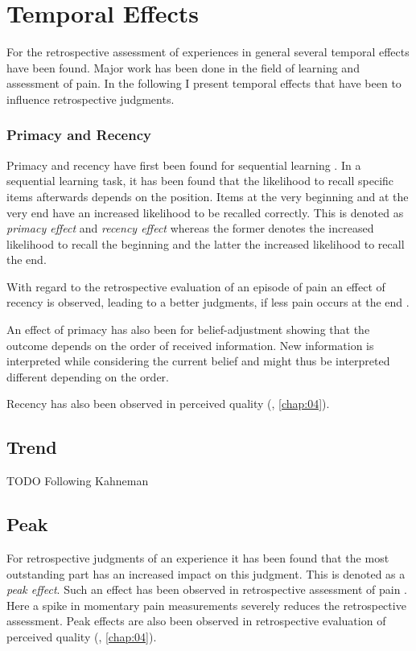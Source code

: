 
\section{Temporal Effects}

For the retrospective assessment of experiences in general several temporal effects have been found.
Major work has been done in the field of learning and assessment of pain.
In the following I present temporal effects that have been to influence retrospective judgments.

\subsubsection*{Primacy and Recency}
Primacy and recency have first been found for sequential learning \citep[cf.,][]{murdock_jr._serial_1962}.
In a sequential learning task, it has been found that the likelihood to recall specific items afterwards depends on the position.
Items at the very beginning and at the very end have an increased likelihood to be recalled correctly.
This is denoted as \emph{primacy effect} and \emph{recency effect} whereas the former denotes the increased likelihood to recall the beginning and the latter the increased likelihood to recall the end.

With regard to the retrospective evaluation of an episode of pain an effect of recency is observed, leading to a better judgments, if less pain occurs at the end \citep[\cf,][]{kahneman_when_1993, redelmeier_patients_1996}.

An effect of primacy has also been for belief-adjustment showing that the outcome depends on the order of received information.
New information is interpreted while considering the current belief and might thus be interpreted different depending on the order.

Recency has also been observed in perceived quality (\cf, \autoref{chap:04}).

\subsection*{Trend}

TODO Following Kahneman

\subsection*{Peak}
For retrospective judgments of an experience it has been found that the most outstanding part has an increased impact on this judgment.
This is denoted as a \emph{peak effect}.
Such an effect has been observed in retrospective assessment of pain \citep[\cf,][]{kahneman_when_1993, redelmeier_patients_1996}.
Here a spike in momentary pain measurements severely reduces the retrospective assessment.
Peak effects are also been observed in retrospective evaluation of perceived quality (\cf, \autoref{chap:04}).

